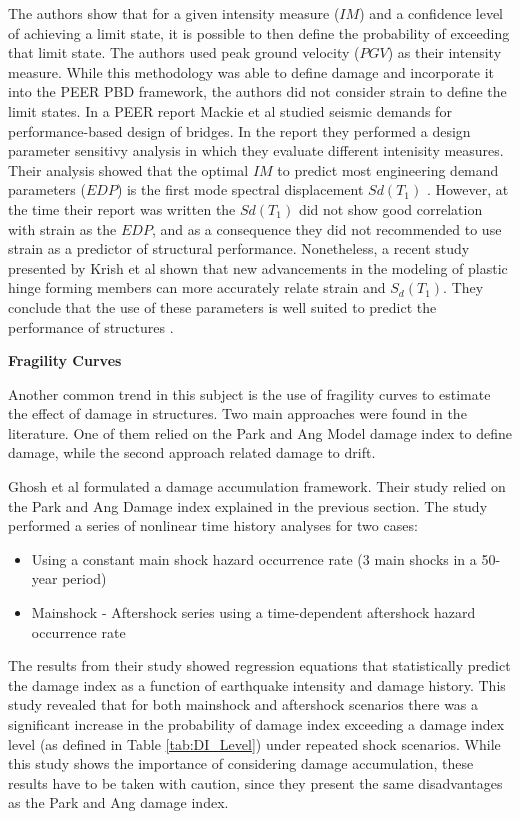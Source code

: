 The authors show that for a given intensity measure ($IM$) and a confidence level of achieving a limit state, it is possible to then define the probability  of exceeding that limit state. The authors used peak ground velocity ($PGV$) as their intensity measure. While this methodology was able to define damage and incorporate it into the PEER PBD framework, the authors did not consider strain to define the limit states. In a PEER report Mackie et al studied seismic demands for performance-based design of bridges. In the report they performed a design parameter sensitivy analysis in which they evaluate different intenisity measures. Their analysis showed that the optimal $IM$ to predict most engineering demand parameters ($EDP$) is the first mode spectral displacement $Sd(T_{1})$  \cite{Mackie2003}. However, at the time their report was written the $Sd(T_{1})$ did not show good correlation with strain as the $EDP$, and as a consequence they did not recommended to use strain as a predictor of structural performance. Nonetheless, a recent study presented by Krish et al shown that  new advancements in the modeling of plastic hinge forming members can more accurately relate strain and $S_{d}(T_{1})$. They conclude that the use of these parameters is well suited to predict the performance of structures \cite{Krish2018}.

\textbf{Fragility Curves}

Another common trend in this subject is the use of fragility curves to estimate the effect of damage in structures. Two main approaches were found in the literature. One of them relied on the Park and Ang Model damage index to define damage, while the second approach related damage to drift.

Ghosh et al \cite{Ghosh2015} formulated a damage accumulation framework. Their study relied on the Park and Ang Damage index explained in the previous section. The study performed a series of nonlinear time history analyses for two cases:

\begin{itemize}
	\item Using a constant main shock hazard occurrence rate (3 main shocks in a 50-year period)
	\item Mainshock - Aftershock series using a time-dependent aftershock hazard occurrence rate
\end{itemize}

The results from their study showed regression equations that statistically predict the damage index as a function of earthquake intensity and damage history. This study revealed that for both mainshock and aftershock scenarios there was a significant increase in the probability of damage index exceeding a damage index level (as defined in Table \ref{tab:DI_Level}) under repeated shock scenarios. While this study shows the importance of considering damage accumulation, these results have to be taken with caution, since they present the same disadvantages as the Park and Ang damage index.

